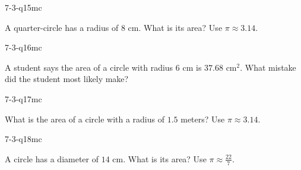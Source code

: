 \begin{practiceQuestion}{7-3-q15}{mc}
\begin{questionText}
A quarter-circle has a radius of $8$ cm. What is its area? Use $\pi \approx 3.14$.
\end{questionText}
\end{practiceQuestion}

\begin{practiceQuestion}{7-3-q16}{mc}
\begin{questionText}
A student says the area of a circle with radius $6$ cm is $37.68$ cm$^2$. What mistake did the student most likely make?
\end{questionText}
\end{practiceQuestion}

\begin{practiceQuestion}{7-3-q17}{mc}
\begin{questionText}
What is the area of a circle with a radius of $1.5$ meters? Use $\pi \approx 3.14$.
\end{questionText}
\end{practiceQuestion}

\begin{practiceQuestion}{7-3-q18}{mc}
\begin{questionText}
A circle has a diameter of $14$ cm. What is its area? Use $\pi \approx \frac{22}{7}$.
\end{questionText}
\end{practiceQuestion}


